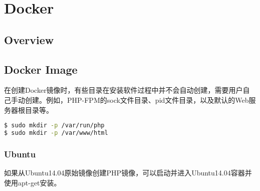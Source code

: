 \part{Docker}


\chapter{Overview}




\chapter{Docker Image}

在创建Docker镜像时，有些目录在安装软件过程中并不会自动创建，需要用户自己手动创建。例如，PHP-FPM的sock文件目录、pid文件目录，以及默认的Web服务器根目录等。


\begin{lstlisting}[language=bash]
$ sudo mkdir -p /var/run/php
$ sudo mkdir -p /var/www/html
\end{lstlisting}

\section{Ubuntu}


如果从Ubuntu14.04原始镜像创建PHP镜像，可以启动并进入Ubuntu14.04容器并使用apt-get安装。


